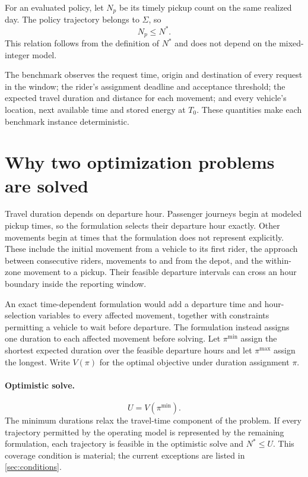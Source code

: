 For an evaluated policy, let $N_p$ be its timely pickup count on the same realized day. The policy
trajectory belongs to $\Sigma$, so
\begin{equation}
  N_p \leq N^*.
  \label{eq:policy-optimum}
\end{equation}
This relation follows from the definition of $N^*$ and does not depend on the mixed-integer model.

The benchmark observes the request time, origin and destination of every request in the window; the
rider's assignment deadline and acceptance threshold; the expected travel duration and distance for
each movement; and every vehicle's location, next available time and stored energy at $T_0$. These
quantities make each benchmark instance deterministic.

\section{Why two optimization problems are solved}
\label{sec:bounds}

Travel duration depends on departure hour. Passenger journeys begin at modeled pickup times, so the
formulation selects their departure hour exactly. Other movements begin at times that the formulation
does not represent explicitly. These include the initial movement from a vehicle to its first rider,
the approach between consecutive riders, movements to and from the depot, and the within-zone movement
to a pickup. Their feasible departure intervals can cross an hour boundary inside the reporting window.

An exact time-dependent formulation would add a departure time and hour-selection variables to every
affected movement, together with constraints permitting a vehicle to wait before departure. The
formulation instead assigns one duration to each affected movement before solving. Let
$\pi^{\min}$ assign the shortest expected duration over the feasible departure hours and let
$\pi^{\max}$ assign the longest. Write $V(\pi)$ for the optimal objective under duration assignment
$\pi$.

\paragraph{Optimistic solve.}
\begin{equation}
  U = V(\pi^{\min}).
\end{equation}
The minimum durations relax the travel-time component of the problem. If every trajectory permitted by the operating model
is represented by the remaining formulation, each trajectory is feasible in the optimistic solve and
$N^*\leq U$. This coverage condition is material; the current exceptions are listed in
\cref{sec:conditions}.

